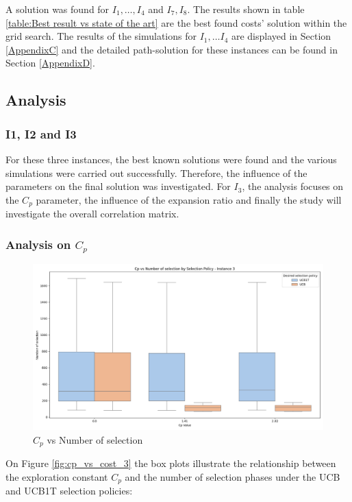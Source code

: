 A solution was found for $I_1, \ldots, I_4$ and $I_7, I_8$. The results shown in table \ref{table:Best result vs state of the art} are the best found costs' solution within the grid search. The results of the simulations for $I_1,\ldots I_4$ are displayed in Section \ref{AppendixC} and the detailed path-solution for these instances can be found in Section \ref{AppendixD}.
\newpage
\subsection{Analysis}
\subsubsection{I1, I2 and I3}
For these three instances, the best known solutions were found and the various simulations were carried out successfully. Therefore, the influence of the parameters on the final solution was investigated. For $I_3$, the analysis focuses on the $C_p$ parameter, the influence of the expansion ratio and finally the study will investigate the overall correlation matrix.

\subsubsection*{Analysis on $C_p$}
\begin{figure}[!ht]
    \centering
    \includegraphics[width=\textwidth]{Figures/3 - cp_vs_selection.png}
    \caption{$C_p$ vs Number of selection}
    \label{fig:cp_vs_selection_3}
\end{figure}

On Figure \ref{fig:cp_vs_cost_3} the box plots illustrate the relationship between the exploration constant \( C_p \) and the number of selection phases under the UCB and UCB1T selection policies:

